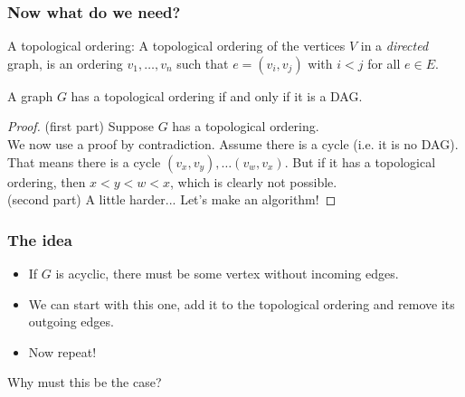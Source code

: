 \begin{frame}
	\frametitle{Now what do we need?}
	
A topological ordering: 
			A topological ordering of the vertices $V$ in a \textit{directed} graph, is an ordering $v_1, \dots, v_n$ such
			that $e=(v_i,v_j)$ with $i < j$ for all $e \in E$.

		
			A graph $G$ has a topological ordering if and only if it is a DAG.
		
		\begin{proof}
			(first part) Suppose $G$ has a topological ordering.\\
			
			We now use a proof by contradiction. Assume there is a cycle (i.e. it is no DAG). That means there is a cycle
			$(v_x, v_y), \dots (v_w, v_x)$. But if it has a topological ordering, then $x < y < w < x$, which is clearly not
			possible.\\
			
			(second part) A little harder... Let's make an algorithm!
		\end{proof}
\end{frame}

\begin{frame}
	\frametitle{The idea}

			\begin{itemize}
				\item 
					If $G$ is acyclic, there must be some vertex without incoming edges.
				\item
					We can start with this one, add it to the topological ordering and remove its outgoing edges.
				\item
					Now repeat!
			\end{itemize}

				Why must this be the case?
\end{frame}

